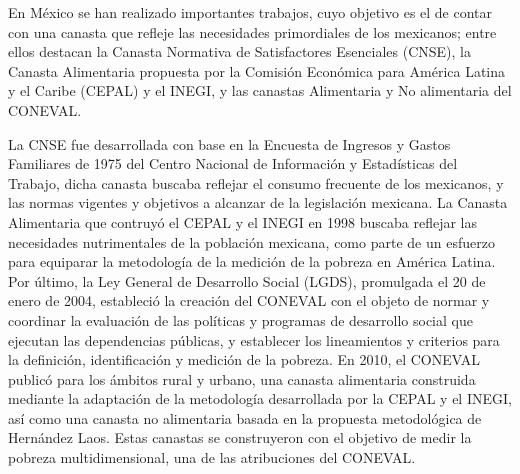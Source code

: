 En México se han realizado importantes trabajos, cuyo objetivo es el de contar con una canasta que refleje las necesidades primordiales de los mexicanos; entre ellos destacan la Canasta Normativa de Satisfactores Esenciales (CNSE), la Canasta Alimentaria propuesta por la Comisión Económica para América Latina y el Caribe (CEPAL) y el INEGI, y las canastas Alimentaria y No alimentaria del CONEVAL.

La CNSE fue desarrollada con base en la Encuesta de Ingresos y Gastos Familiares de 1975 del Centro Nacional de Información y Estadísticas del Trabajo, dicha canasta buscaba reflejar el consumo frecuente de los mexicanos, y las normas vigentes y objetivos a alcanzar de la legislación mexicana. La Canasta Alimentaria que contruyó el CEPAL y el INEGI en 1998 buscaba reflejar las necesidades nutrimentales de la población mexicana, como parte de un esfuerzo para equiparar la metodología de la medición de la pobreza en América Latina. Por último, la Ley General de Desarrollo Social (LGDS), promulgada el 20 de enero de 2004, estableció la creación del CONEVAL con el objeto de normar y coordinar la evaluación de las políticas y programas de desarrollo social que ejecutan las dependencias públicas, y establecer los lineamientos y criterios para la definición, identificación y medición de la pobreza. En 2010, el CONEVAL publicó para los ámbitos rural y urbano, una canasta alimentaria construida mediante la adaptación de la metodología desarrollada por la CEPAL y el INEGI, así como una canasta no alimentaria basada en la propuesta metodológica de Hernández Laos. Estas canastas se construyeron con el objetivo de medir la pobreza multidimensional, una de las atribuciones del CONEVAL.